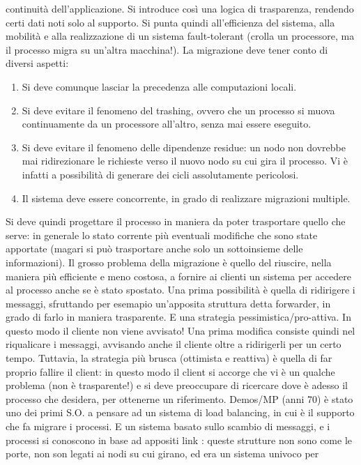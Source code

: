 continuità dell'applicazione. Si introduce così una logica di trasparenza, rendendo certi dati noti solo al supporto. Si 
punta quindi all'efficienza del sistema, alla mobilità e alla realizzazione di un sistema fault-tolerant (crolla un 
processore, ma il processo migra su un'altra macchina!).
La migrazione deve tener conto di diversi aspetti:
\begin{enumerate}
 \item Si deve comunque lasciar la precedenza alle computazioni locali.
 \item Si deve evitare il fenomeno del trashing, ovvero che un processo si muova continuamente da un processore 
 all'altro, senza mai essere eseguito.
 \item Si deve evitare il fenomeno delle dipendenze residue: un nodo non dovrebbe mai ridirezionare le richieste verso 
 il nuovo nodo su cui gira il processo. Vi è infatti a possibilità di generare dei cicli assolutamente pericolosi.
 \item Il sistema deve essere concorrente, in grado di realizzare migrazioni multiple.
\end{enumerate}
Si deve quindi progettare il processo in maniera da poter trasportare quello che serve: in generale lo stato corrente 
più eventuali modifiche che sono state apportate (magari si può trasportare anche solo un sottoinsieme delle  
informazioni).
Il grosso problema della migrazione è quello del riuscire, nella maniera più efficiente e meno costosa, a fornire ai 
clienti un sistema per accedere al processo anche se è stato spostato.
Una prima possibilità è quella di ridirigere i messaggi, sfruttando per esemapio un'apposita struttura detta forwarder, 
in grado di farlo in maniera trasparente. E una strategia pessimistica/pro-attiva. In questo modo il cliente non viene 
avvisato! Una prima modifica consiste quindi nel riqualicare i messaggi, avvisando anche il cliente oltre a ridirigerli 
per un certo tempo.
Tuttavia, la strategia più brusca (ottimista e reattiva) è quella di far proprio fallire il client: in questo modo il 
client si accorge che vi è un qualche problema (non è trasparente!) e si deve preoccupare di ricercare dove è adesso il 
processo che desidera, per ottenerne un riferimento.
Demos/MP (anni 70) è stato uno dei primi S.O. a pensare ad un sistema di load balancing, in cui è il supporto che fa 
migrare i processi. E un sistema basato sullo scambio di messaggi, e i processi si conoscono in base ad appositi
link : queste strutture non sono come le porte, non son legati ai nodi su cui girano, ed era un sistema univoco per 

